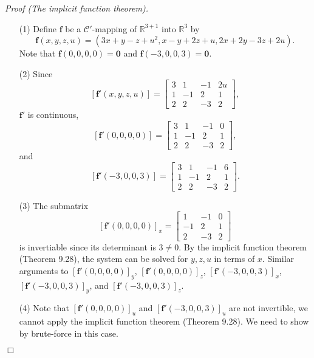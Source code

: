 \documentclass{article}
\begin{document}
\emph{Proof (The implicit function theorem).}
\begin{enumerate}
\item[(1)]
  Define $\mathbf{f}$ be a $\mathscr{C}'$-mapping
  of $\mathbb{R}^{3+1}$ into $\mathbb{R}^3$ by
  \[
    \mathbf{f}(x,y,z,u)
    = (3x+y-z+u^2,x-y+2z+u,2x+2y-3z+2u).
  \]
  Note that $\mathbf{f}(0,0,0,0) = \mathbf{0}$
  and $\mathbf{f}(-3,0,0,3) = \mathbf{0}$.

\item[(2)]
  Since
  \[
    [\mathbf{f}'(x,y,z,u)]
    = \begin{bmatrix}
      3 &  1 & -1 & 2u \\
      1 & -1 &  2 &  1 \\
      2 &  2 & -3 &  2
    \end{bmatrix},
  \]
  $\mathbf{f}'$ is continuous,
  \[
    [\mathbf{f}'(0,0,0,0)]
    = \begin{bmatrix}
      3 &  1 & -1 &  0 \\
      1 & -1 &  2 &  1 \\
      2 &  2 & -3 &  2
    \end{bmatrix},
  \]
  and
  \[
    [\mathbf{f}'(-3,0,0,3)]
    = \begin{bmatrix}
      3 &  1 & -1 &  6 \\
      1 & -1 &  2 &  1 \\
      2 &  2 & -3 &  2
    \end{bmatrix}.
  \]

\item[(3)]
  The submatrix
  \[
    [\mathbf{f}'(0,0,0,0)]_x
    = \begin{bmatrix}
       1 & -1 &  0 \\
      -1 &  2 &  1 \\
       2 & -3 &  2
    \end{bmatrix}
  \]
  is invertiable since its determinant is $3 \neq 0$.
  By the implicit function theorem (Theorem 9.28),
  the system can be solved for $y,z,u$ in terms of $x$.
  Similar arguments to
  $[\mathbf{f}'(0,0,0,0)]_y$,
  $[\mathbf{f}'(0,0,0,0)]_z$,
  $[\mathbf{f}'(-3,0,0,3)]_x$,
  $[\mathbf{f}'(-3,0,0,3)]_y$, and
  $[\mathbf{f}'(-3,0,0,3)]_z$.

\item[(4)]
  Note that $[\mathbf{f}'(0,0,0,0)]_u$ and $[\mathbf{f}'(-3,0,0,3)]_u$
  are not invertible, we cannot apply the implicit function theorem (Theorem 9.28).
  We need to show by brute-force in this case.
\end{enumerate}
$\Box$ \\\\
\end{document}

